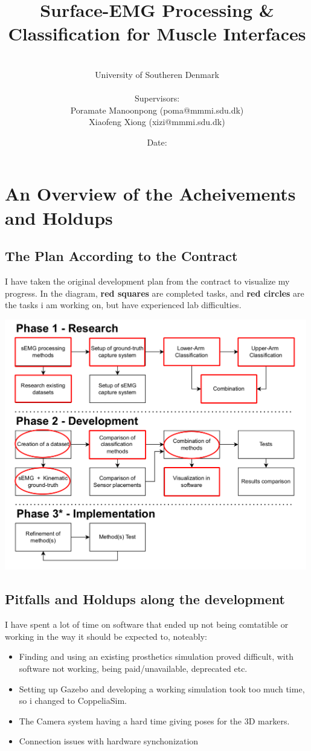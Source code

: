 \documentclass[a4paper, 12pt]{article}
\title{Surface-EMG Processing \& Classification for Muscle Interfaces}
\author{
\\University of Southeren Denmark
\\
\\Supervisors: 
\\Poramate Manoonpong (poma@mmmi.sdu.dk)
\\Xiaofeng Xiong (xizi@mmmi.sdu.dk)
}
\date{Date: }
\begin{document}

\section{An Overview of the Acheivements and Holdups}
\subsection{The Plan According to the Contract}

I have taken the original development plan from the contract to visualize my progress.
In the diagram, \textbf{red squares} are completed tasks, and \textbf{red circles} are the tasks i am working on, but have experienced lab difficulties.

\begin{center}
\includegraphics[width=0.99\textwidth]{meta-graph-progress.png}
\end{center}

\subsection{Pitfalls and Holdups along the development}

I have spent a lot of time on software that ended up not being comtatible or working in the way it should be expected to, noteably:

\begin{itemize}
\item Finding and using an existing prosthetics simulation proved difficult, with software not working, being paid/unavailable, deprecated etc. 
\item Setting up Gazebo and developing a working simulation took too much time, so i changed to CoppeliaSim.
\item The Camera system having a hard time giving poses for the 3D markers.
\item Connection issues with hardware synchonization
\end{itemize}
\end{document}
